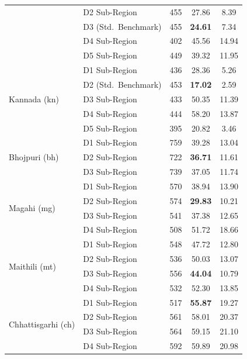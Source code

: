 \begin{table}[t]
\begin{tabular}{llccc}
 & D2 Sub-Region                     & 455 & 27.86 & 8.39 \\
 & D3 (Std.\ Benchmark)              & 455 & \textbf{24.61} & 7.34 \\
 & D4 Sub-Region                     & 402 & 45.56 & 14.94 \\
 & D5 Sub-Region                     & 449 & 39.32 & 11.95 \\
\hline
\multirow{5}{*}{Kannada (kn)}
 & D1 Sub-Region                     & 436 & 28.36 & 5.26 \\
 & D2 (Std.\ Benchmark)              & 453 & \textbf{17.02} & 2.59 \\
 & D3 Sub-Region                     & 433 & 50.35 & 11.39 \\
 & D4 Sub-Region                     & 444 & 58.20 & 13.87 \\
 & D5 Sub-Region                     & 395 & 20.82 & 3.46 \\
\hline
\multirow{3}{*}{Bhojpuri (bh)}
 & D1 Sub-Region                     & 759 & 39.28 & 13.04 \\
 & D2 Sub-Region                     & 722 & \textbf{36.71} & 11.61 \\
 & D3 Sub-Region                     & 739 & 37.05 & 11.74 \\
\hline
\multirow{4}{*}{Magahi (mg)}
 & D1 Sub-Region                     & 570 & 38.94 & 13.90 \\
 & D2 Sub-Region                     & 574 & \textbf{29.83} & 10.21 \\
 & D3 Sub-Region                     & 541 & 37.38 & 12.65 \\
 & D4 Sub-Region                     & 508 & 51.72 & 18.66 \\
\hline
\multirow{4}{*}{Maithili (mt)}
 & D1 Sub-Region                     & 548 & 47.72 & 12.80 \\
 & D2 Sub-Region                     & 536 & 50.03 & 13.07 \\
 & D3 Sub-Region                     & 556 & \textbf{44.04} & 10.79 \\
 & D4 Sub-Region                     & 532 & 52.30 & 13.85 \\
\hline
\multirow{4}{*}{Chhattisgarhi (ch)}
 & D1 Sub-Region                     & 517 & \textbf{55.87} & 19.27 \\
 & D2 Sub-Region                     & 561 & 58.01 & 20.37 \\
 & D3 Sub-Region                     & 564 & 59.15 & 21.10 \\
 & D4 Sub-Region                     & 592 & 59.89 & 20.98 \\
\hline
\end{tabular}
\end{table}

